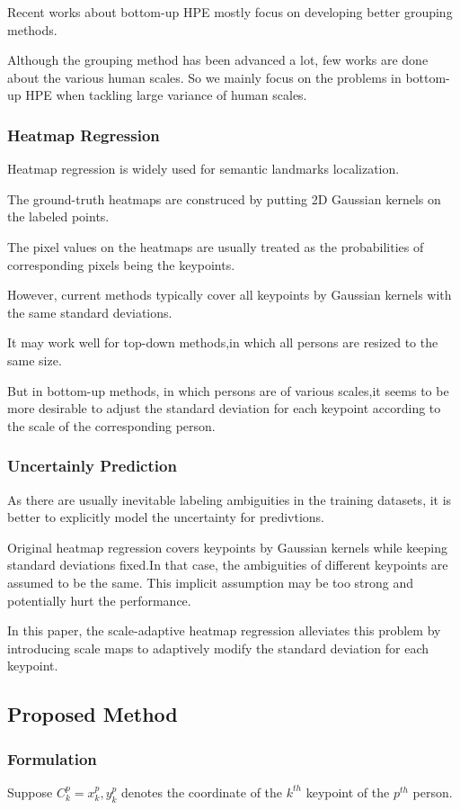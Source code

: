 \documentclass[11pt]{article}
\begin{document}
Recent works about bottom-up HPE mostly focus on developing better grouping methods.

Although the grouping method has been advanced a lot, few works are done about the various human scales. So we mainly focus on the problems in bottom-up HPE when tackling large variance of human scales.
\subsubsection{Heatmap Regression}
Heatmap regression is widely used for semantic landmarks localization.

The ground-truth heatmaps are construced by putting 2D Gaussian kernels on the labeled points.

The pixel values on the heatmaps are usually treated as the probabilities of corresponding pixels being the keypoints.

However, current methods typically cover all keypoints by Gaussian kernels with the same standard deviations.

It may work well for top-down methods,in which all persons are resized to the same size.

But in bottom-up methods, in which persons are of various scales,it seems to be more desirable to adjust the standard deviation for each keypoint according to the scale of the corresponding person.

\subsubsection{Uncertainly Prediction}
As there are usually inevitable labeling ambiguities in the training datasets, it is better to explicitly model the uncertainty for predivtions.

Original heatmap regression covers keypoints by Gaussian kernels while keeping standard deviations fixed.In that case, the ambiguities of different keypoints are assumed to be the same. This implicit assumption may be too strong and potentially hurt the performance.

In this paper, the scale-adaptive heatmap regression alleviates this problem by introducing scale maps to adaptively modify the standard deviation for each keypoint.

\subsection{Proposed Method}
\subsubsection{Formulation}
Suppose $C^p_k={x^p_k,y^p_k}$ denotes the coordinate of the $k^{th}$ keypoint of the $p^{th}$ person.
\end{document}
